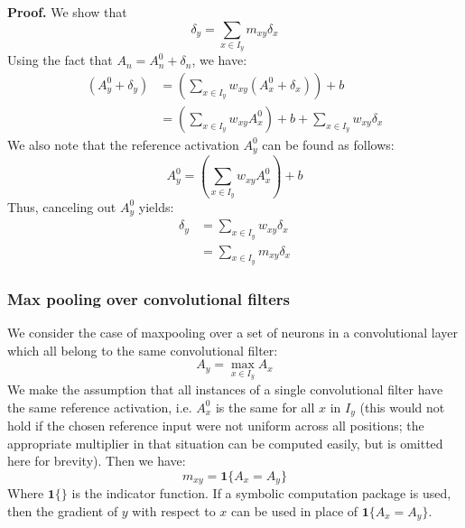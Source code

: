 \documentclass{article}
\begin{document}
{\bf Proof.} We show that
\begin{equation}
\delta_y = \sum_{x \in I_y} m_{xy} \delta_x 
\end{equation}
Using the fact that $A_n = A_n^0 + \delta_n$, we have:
\begin{equation}
\begin{aligned}
(A_y^0 + \delta_y) &= \left(\sum_{x \in I_y} w_{xy} (A_x^0 + \delta_x) \right) + b \\
                              &= \left(\sum_{x \in I_y} w_{xy} A_x^0 \right) + b + \sum_{x \in I_y} w_{xy} \delta_x
\end{aligned}
\end{equation} 
We also note that the reference activation $A_y^0$ can be found as follows:
\begin{equation}
A_y^0 = \left(\sum_{x \in I_y} w_{xy} A_x^0 \right) + b
\end{equation}
Thus, canceling out $A_y^0$ yields:
\begin{equation}
\begin{aligned}
\delta_y &= \sum_{x \in I_y} w_{xy} \delta_x\\
             &= \sum_{x \in I_y} m_{xy} \delta_x
\end{aligned}
\end{equation} 

\subsubsection{Max pooling over convolutional filters}

We consider the case of maxpooling over a set of neurons in a convolutional layer which all belong to the same convolutional filter:
\begin{equation}
A_y = \max_{x \in I_y} A_x
\end{equation}
We make the assumption that all instances of a single convolutional filter have the same reference activation, i.e. $A_x^0$ is the same for all $x$ in $I_y$ (this would not hold if the chosen reference input were not uniform across all positions; the appropriate multiplier in that situation can be computed easily, but is omitted here for brevity). Then we have:
\begin{equation}
m_{xy} = \bm{1}\{A_x = A_y\}
\end{equation}
Where $\bm{1}\{\}$ is the indicator function. If a symbolic computation package is used, then the gradient of $y$ with respect to $x$ can be used in place of $\bm{1}\{A_x = A_y\}$.
\end{document}
